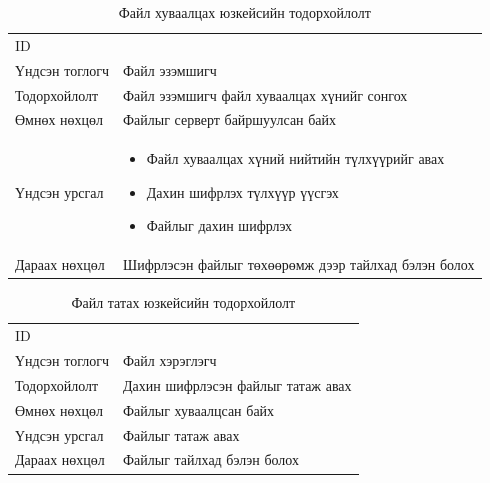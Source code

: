 \begin{table}[H]
    \footnotesize
    \centering
    \begin{tabularx}{\textwidth}{|>{\hsize=0.3\hsize}X|>{\hsize=0.7\hsize}X|}
        \hline
        \multicolumn{2}{|c|}{Файл хуваалцах} \\
        \hline
        ID & 5 \\
        \hline
        Үндсэн тоглогч & Файл эзэмшигч\\
        \hline
        Тодорхойлолт & Файл эзэмшигч файл хуваалцах хүнийг сонгох\\
        \hline
        Өмнөх нөхцөл & Файлыг серверт байршуулсан байх\\
        \hline
        Үндсэн урсгал &
        \begin{minipage}{\linewidth}
            \begin{itemize}
            \item Файл хуваалцах хүний нийтийн түлхүүрийг авах
            \item Дахин шифрлэх түлхүүр үүсгэх
            \item Файлыг дахин шифрлэх
            \end{itemize}
        \end{minipage}
        \\
        \hline
        Дараах нөхцөл & Шифрлэсэн файлыг төхөөрөмж дээр тайлхад бэлэн болох\\
        \hline
    \end{tabularx}
    \caption{Файл хуваалцах юзкейсийн тодорхойлолт}
\end{table}

\begin{table}[H]
    \footnotesize
    \centering
    \begin{tabularx}{\textwidth}{|>{\hsize=0.3\hsize}X|>{\hsize=0.7\hsize}X|}
        \hline
        \multicolumn{2}{|c|}{Файл татах} \\
        \hline
        ID & 6 \\
        \hline
        Үндсэн тоглогч & Файл хэрэглэгч\\
        \hline
        Тодорхойлолт & Дахин шифрлэсэн файлыг татаж авах\\
        \hline
        Өмнөх нөхцөл & Файлыг хуваалцсан байх\\
        \hline
        Үндсэн урсгал & Файлыг татаж авах\\
        \hline
        Дараах нөхцөл & Файлыг тайлхад бэлэн болох\\
        \hline
    \end{tabularx}
    \caption{Файл татах юзкейсийн тодорхойлолт}
\end{table}


